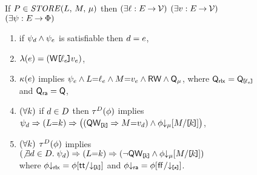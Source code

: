 \begin{figure*}
  \begin{center}
  \begin{minipage}{0.88\textwidth}
  \noindent
  If $\aPS \in \sSTORE[\amode]{\cExp}{\aExp}$ then
  $(\exists\cVal:\aEvs\fun\Val)$
  $(\exists\aVal:\aEvs\fun\Val)$
  $(\exists\bForm:\aEvs\fun\Formulae)$
  \begin{enumerate}
  \item if $\bForm_\bEv\land\bForm_\aEv$ is satisfiable then $\bEv=\aEv$,
  \item $\labelingAct(\aEv) = \DWREFP{\cVal_\aEv}{\aVal_\aEv}$,
  \item 
    $\labelingForm(\aEv)$ implies
    \begin{math}
      \bForm_\aEv
      \land \cExp{=}\cVal_\aEv
      \land \aExp{=}\aVal_\aEv
      \land \RW
      \land \Qmode{\amode}
    \end{math},
    where
    $\Qmode{\mRLX}=\QxREF{\cVal_\aEv}$ and $\Qmode{\mRA}=\Q$, %
  \item
    \begin{math}
      (\forall\dVal)
    \end{math}
    if
    $\bEv\in\bEvs$
    then
    $\aTr[\bEvs](\aForm)$ implies 
    \begin{math}
      \bForm_\bEv
      \limplies (\cExp{=}\dVal)
      \limplies \PBRbig{
        (\QwREF{\dVal} \limplies \aExp{=}\aVal_\bEv)
        \land \aForm \Dmode{\amode}[\aExp/\REF{\dVal}]
      }
    \end{math},
  \item %
    \begin{math}
      (\forall\dVal)
    \end{math}
    $\aTr[\bEvs](\aForm)$ implies 
    \begin{math}
      (\not\exists\bEv\in\bEvs.\; \bForm_\bEv)
      \limplies (\cExp{=}\dVal)
      \limplies \PBR{
        \lnot\QwREF{\dVal}
        \land \aForm \Dmode{\amode}[\aExp/\REF{\dVal}]
      }
    \end{math}
    \\ where 
      $\aForm\Dmode{\mRLX}=\aForm[\TRUE/\DxREF{\dVal}]$ and
      $\aForm\Dmode{\mRA}=\aForm[\FALSE/\DREF]$. %
  \end{enumerate}

\end{minipage}
\end{center}
\end{figure*}
